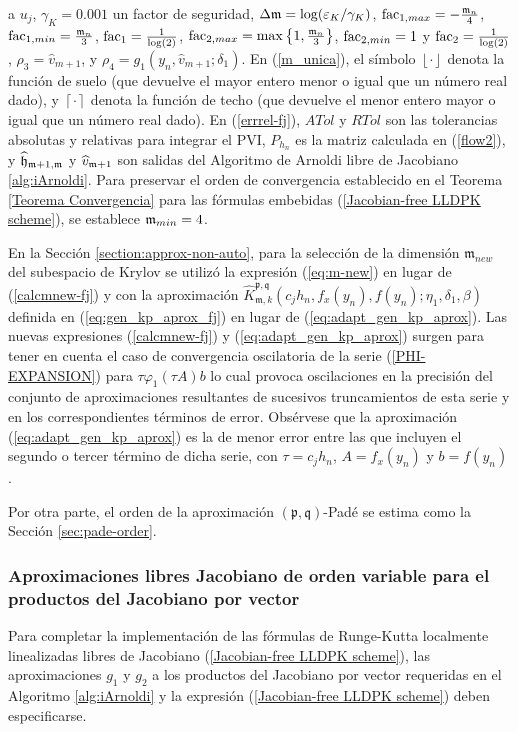 a $u_j$, $\gamma_{K}=0.001$ un factor de seguridad,
$\Delta\mathfrak{m}=\log(\varepsilon_{K}/\gamma_{K})$,
$\mathrm{fac}_{1,max}= -\frac{\mathfrak{m}_n}{4}$, $\mathrm{fac}_{1,min}= \frac{\mathfrak{m}_n}{3}$, $\mathrm{fac}_1=\frac{1} {\log(2)}$, $\mathrm{fac}_{2,max}= \max\left\{  1,\frac{\mathfrak{m}_{n}}{3}  \right\}$, $\mathrm{fac}_{2,min}= 1 $ y $\mathrm{fac}_2=\frac{1}{\log(2)}$, $\rho_3 =\hat{v}_{m+1}$, y $\rho_4 = g_1(y_n,\hat{v}_ {m+1};\delta_1)$. En (\ref{m_unica}), el símbolo $\left\lfloor \cdot \right\rfloor$ denota la función de suelo (que devuelve el mayor entero menor o igual que un número real dado), y $\left\lceil \cdot \right\rceil$ denota la función de techo (que devuelve el menor entero mayor o igual que un número real dado). En (\ref{errrel-fj}), $ATol$ y $RTol$ son las tolerancias absolutas y relativas para integrar el PVI, $P_{h_n}$ es la matriz calculada en (\ref{flow2}), y $\widehat {\mathfrak{h}}_{\mathfrak{m}+1,\mathfrak{m}}$ y $\widehat{v}_{\mathfrak{m}+1}$ son salidas del Algoritmo de Arnoldi libre de Jacobiano \ref{alg:iArnoldi}. Para preservar el orden de convergencia establecido en el Teorema \ref{Teorema Convergencia} para las fórmulas embebidas (\ref{Jacobian-free LLDPK scheme}), se establece $\mathfrak{m}_{min}=4$.

En la Sección \ref{section:approx-non-auto}, para la selección de la dimensión $\mathfrak{m}_{new}$ del subespacio de Krylov se utilizó la expresión (\ref{eq:m-new}) en lugar de (\ref{calcmnew-fj}) y con la aproximación
$\widehat{K}_{\mathfrak{m},k}^{\mathfrak{p},\mathfrak{q}}\left(
c_{j}h_{n},f_{x}(y_{n}),f(y_{n});\eta _{1},\delta _{1},\beta \right)
$ definida en (\ref{eq:gen_kp_aprox_fj}) en lugar de (\ref{eq:adapt_gen_kp_aprox}). Las nuevas expresiones (\ref{calcmnew-fj}) y (\ref{eq:adapt_gen_kp_aprox}) surgen para tener en cuenta el caso de convergencia oscilatoria de la serie (\ref{PHI-EXPANSION}) para $\tau\varphi_1(\tau A) b$ lo cual provoca oscilaciones en la precisión del conjunto de aproximaciones resultantes de sucesivos truncamientos de esta serie y en los correspondientes términos de error. Obsérvese que la aproximación (\ref{eq:adapt_gen_kp_aprox}) es la de menor error entre las que incluyen el segundo o tercer término de dicha serie, con $\tau = c_jh_n$, $A=f_x(y_n)$ y $b=f(y_n)$.

Por otra parte, el orden de la aproximación $(\mathfrak{p},\mathfrak{q})$-Padé se estima como la Sección \ref{sec:pade-order}.

\subsubsection{Aproximaciones libres Jacobiano de orden variable para el productos del Jacobiano por vector}
Para completar la implementación de las fórmulas de Runge-Kutta localmente linealizadas libres de Jacobiano (\ref{Jacobian-free LLDPK scheme}), las aproximaciones $g_1$ y $g_2$ a los productos del Jacobiano por vector requeridas en el Algoritmo \ref{alg:iArnoldi} y la expresión (\ref{Jacobian-free LLDPK scheme}) deben especificarse.

